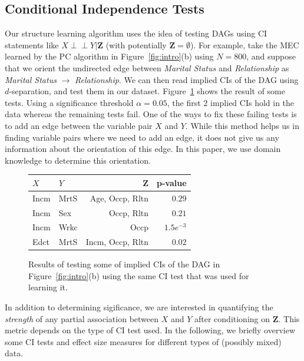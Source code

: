\documentclass{uai2025} %
\def\ci{\perp\!\!\!\!\perp}
\begin{document}
\subsection{Conditional Independence Tests}
\label{sec:ci_tests}
Our structure learning algorithm uses the idea of testing DAGs using CI statements
like $ X \ci Y \rvert \bm{Z} $ (with
potentially $ \bm{Z} = \emptyset $).
For example, take the MEC learned by the PC algorithm in
Figure~\ref{fig:intro}(b) using $ N=800 $, and suppose that we orient 
the undirected edge between \emph{Marital Status} and
\emph{Relationship}  as \emph{Marital Status} $ \rightarrow $
\emph{Relationship}. We can then read implied CIs of the DAG using $d$-separation,
and test them in our dataset. Figure~\ref{fig:ci_table} shows the result of some tests. 
Using a significance threshold  $\alpha=0.05 $, the first $ 2 $
implied CIs hold in the data whereas the remaining tests fail. One of the ways
to fix these failing tests is to add an edge between the variable pair $ X $
and $ Y $. While this method helps us in finding variable pairs where we need
to add an edge, it does not give us any information about the orientation of
this edge. In this paper, we use domain knowledge to determine this
orientation.

\begin{figure}
	\centering
	\begin{tabular}{llrr}
		$X$ & $Y$ & $ \bm{Z} $ & p-value \\
		\hline
		Incm & MrtS &  Age, Occp, Rltn & $ 0.29 $     \\
		Incm & Sex  &  Occp, Rltn      & $ 0.21 $     \\
		Incm & Wrkc &  Occp 	       & $ 1.5e^{-3} $ \\
		Edct & MrtS & Incm, Occp, Rltn & $ 0.02 $       \\
		\hline
	\end{tabular}
	\caption{Results of testing some of implied CIs of the DAG in
		 Figure~\ref{fig:intro}(b) using the same CI test that was used for
		 learning it.}
	\label{fig:ci_table}
\end{figure}

In addition to determining sigificance, we are interested in quantifying the 
\emph{strength} of any partial association between $X$ and $Y$ after conditioning 
on $\mathbf{Z}$. This metric depends on the type of CI test used. In the following,
we briefly overview some CI tests and effect size measures
for different types of (possibly mixed) data.
\end{document}
